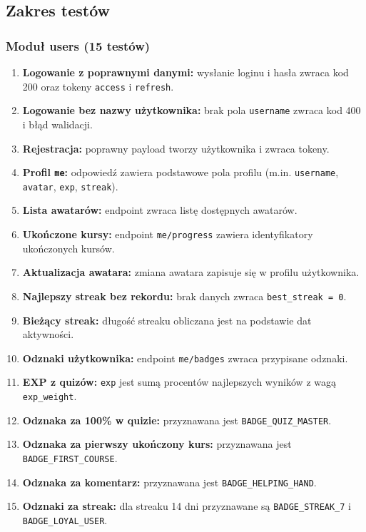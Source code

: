 \documentclass[11pt,a4paper]{article}
\numberwithin{equation}{section}
\begin{document}
\subsection{Zakres testów}

\subsubsection*{Moduł users (15 testów)}
\begin{enumerate}
    \item \textbf{Logowanie z poprawnymi danymi:} wysłanie loginu i hasła zwraca kod 200 oraz tokeny \texttt{access} i \texttt{refresh}.
    \item \textbf{Logowanie bez nazwy użytkownika:} brak pola \texttt{username} zwraca kod 400 i błąd walidacji.
    \item \textbf{Rejestracja:} poprawny payload tworzy użytkownika i zwraca tokeny.
    \item \textbf{Profil \texttt{me}:} odpowiedź zawiera podstawowe pola profilu (m.in. \texttt{username}, \texttt{avatar}, \texttt{exp}, \texttt{streak}).
    \item \textbf{Lista awatarów:} endpoint zwraca listę dostępnych awatarów.
    \item \textbf{Ukończone kursy:} endpoint \texttt{me/progress} zawiera identyfikatory ukończonych kursów.
    \item \textbf{Aktualizacja awatara:} zmiana awatara zapisuje się w profilu użytkownika.
    \item \textbf{Najlepszy streak bez rekordu:} brak danych zwraca \texttt{best\_streak = 0}.
    \item \textbf{Bieżący streak:} długość streaku obliczana jest na podstawie dat aktywności.
    \item \textbf{Odznaki użytkownika:} endpoint \texttt{me/badges} zwraca przypisane odznaki.
    \item \textbf{EXP z quizów:} \texttt{exp} jest sumą procentów najlepszych wyników z wagą \texttt{exp\_weight}.
    \item \textbf{Odznaka za 100\% w quizie:} przyznawana jest \texttt{BADGE\_QUIZ\_MASTER}.
    \item \textbf{Odznaka za pierwszy ukończony kurs:} przyznawana jest \texttt{BADGE\_FIRST\_COURSE}.
    \item \textbf{Odznaka za komentarz:} przyznawana jest \texttt{BADGE\_HELPING\_HAND}.
    \item \textbf{Odznaki za streak:} dla streaku 14 dni przyznawane są \texttt{BADGE\_STREAK\_7} i \texttt{BADGE\_LOYAL\_USER}.
\end{enumerate}
\end{document}
